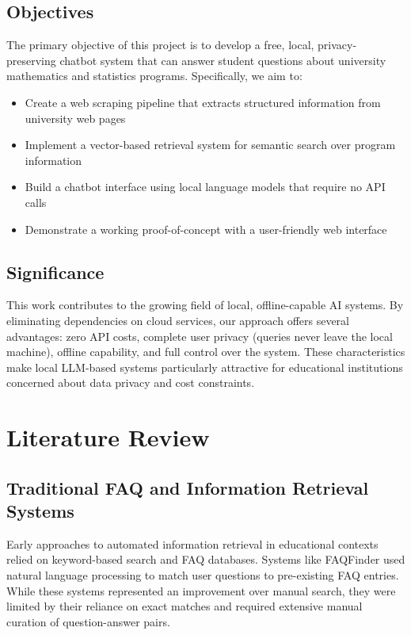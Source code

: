 \documentclass[conference]{IEEEtran}
\begin{document}
\subsection{Objectives}
The primary objective of this project is to develop a free, local, privacy-preserving chatbot system that can answer student questions about university mathematics and statistics programs. Specifically, we aim to:

\begin{itemize}
    \item Create a web scraping pipeline that extracts structured information from university web pages
    \item Implement a vector-based retrieval system for semantic search over program information
    \item Build a chatbot interface using local language models that require no API calls
    \item Demonstrate a working proof-of-concept with a user-friendly web interface
\end{itemize}

\subsection{Significance}
This work contributes to the growing field of local, offline-capable AI systems. By eliminating dependencies on cloud services, our approach offers several advantages: zero API costs, complete user privacy (queries never leave the local machine), offline capability, and full control over the system. These characteristics make local LLM-based systems particularly attractive for educational institutions concerned about data privacy and cost constraints.

\section{Literature Review}
\label{sec:literature}

\subsection{Traditional FAQ and Information Retrieval Systems}
Early approaches to automated information retrieval in educational contexts relied on keyword-based search and FAQ databases. Systems like FAQFinder \cite{faqfinder} used natural language processing to match user questions to pre-existing FAQ entries. While these systems represented an improvement over manual search, they were limited by their reliance on exact matches and required extensive manual curation of question-answer pairs.
\end{document}
